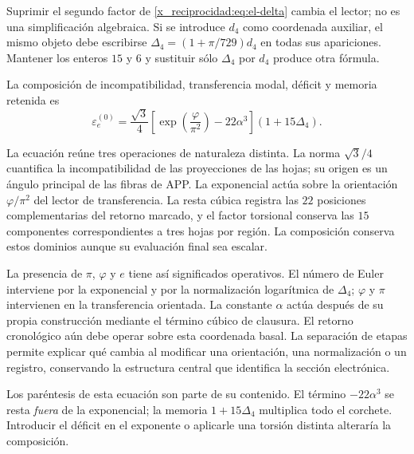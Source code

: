 \begin{remark}
Suprimir el segundo factor de \eqref{x_reciprocidad:eq:el-delta} cambia el lector; no
es una simplificación algebraica. Si se introduce \(d_4\) como
coordenada auxiliar, el mismo objeto debe escribirse
\(\Delta_4=(1+\pi/729)d_4\) en todas sus apariciones. Mantener los
enteros \(15\) y \(6\) y sustituir sólo \(\Delta_4\) por \(d_4\)
produce otra fórmula.
\end{remark}

\begin{definition}
La composición de incompatibilidad, transferencia modal, déficit y memoria retenida
es
\begin{equation}
 \varepsilon_e^{(0)}
 =\frac{\sqrt3}{4}
  \left[\exp\!\left(\frac{\varphi}{\pi^2}\right)-22\alpha^3\right]
  (1+15\Delta_4).
 \label{x_reciprocidad:eq:el-basal}
\end{equation}
\end{definition}

La ecuación reúne tres operaciones de naturaleza distinta. La norma
\(\sqrt3/4\) cuantifica la incompatibilidad de las proyecciones de
las hojas; su origen es un ángulo principal de las fibras de APP.
La exponencial actúa sobre la orientación \(\varphi/\pi^2\) del
lector de transferencia. La resta cúbica registra las \(22\) posiciones
complementarias del retorno marcado, y el factor torsional conserva las
\(15\) componentes correspondientes a tres hojas por región. La
composición conserva estos dominios aunque su evaluación final sea escalar.

La presencia de \(\pi\), \(\varphi\) y \(e\) tiene así significados
operativos. El número de Euler interviene por la exponencial y por
la normalización logarítmica de \(\Delta_4\); \(\varphi\) y \(\pi\)
intervienen en la transferencia orientada. La constante \(\alpha\)
actúa después de su propia construcción mediante el término cúbico
de clausura. El retorno cronológico aún debe operar sobre esta coordenada
basal. La separación de etapas permite explicar qué cambia al modificar
una orientación, una normalización o un registro, conservando la estructura
central que identifica la sección electrónica.

Los paréntesis de esta ecuación son parte de su contenido. El término
\(-22\alpha^3\) se resta \emph{fuera} de la exponencial; la memoria
\(1+15\Delta_4\) multiplica todo el corchete. Introducir el déficit en
el exponente o aplicarle una torsión distinta alteraría la composición.

